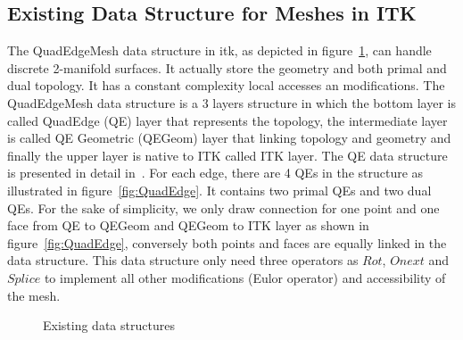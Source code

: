 \documentclass{InsightArticle}
\begin{document}
\subsection{Existing Data Structure for Meshes in ITK}
The QuadEdgeMesh data structure in itk, as depicted in figure~\ref{fig:QuadEdgeMeshStructure}, can handle discrete 2-manifold surfaces. It actually store the geometry and both primal and dual topology. It has a constant complexity local accesses an modifications. The QuadEdgeMesh data structure is a 3 layers structure in which the bottom layer is called QuadEdge (QE) layer that represents the topology, the intermediate layer is called QE Geometric (QEGeom) layer that linking topology and geometry and finally the upper layer is native to ITK called ITK layer. The QE data structure is presented in detail in~\cite{Gouaillard2006}. For each edge, there are 4 QEs in the structure as illustrated in figure~\ref{fig:QuadEdge}. It contains two primal QEs and two dual QEs. For the sake of simplicity, we only draw connection for one point and one face from QE to QEGeom and QEGeom to ITK layer as shown in figure~\ref{fig:QuadEdge}, conversely both points and faces are equally linked in the data structure. This data structure only need three operators as $Rot$, $Onext$ and $Splice$ to implement all other modifications (Eulor operator) and accessibility of the mesh. 
\begin{figure}
	\centering
	\caption{Existing data structures}
	\label{fig:QuadEdgeMeshStructure}
\end{figure}
\end{document}
